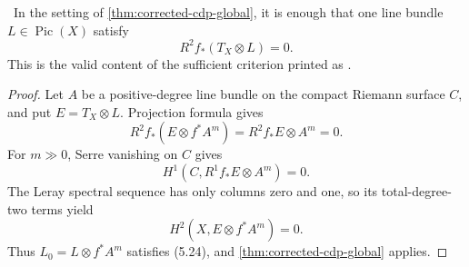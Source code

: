 \begin{corollary}\label{cor:corrected-cdp-relative}
\Verified\ In the setting of
\cref{thm:corrected-cdp-global}, it is enough that one line bundle
\(L\in\operatorname{Pic}(X)\) satisfy
\[
 R^2f_*(T_X\otimes L)=0.
\tag{5.29}
\]
This is the valid content of the sufficient criterion printed as
\cite[Proposition~2.4, p.~680]{CDP2020}.
\end{corollary}

\begin{proof}
Let \(A\) be a positive-degree line bundle on the compact Riemann surface
\(C\), and put \(E=T_X\otimes L\).  Projection formula gives
\[
 R^2f_*(E\otimes f^*A^m)=R^2f_*E\otimes A^m=0.
\]
For \(m\gg0\), Serre vanishing on \(C\) gives
\[
 H^1(C,R^1f_*E\otimes A^m)=0.
\]
The Leray spectral sequence has only columns zero and one, so its
total-degree-two terms yield
\[
 H^2(X,E\otimes f^*A^m)=0.
\]
Thus \(L_0=L\otimes f^*A^m\) satisfies (5.24), and
\cref{thm:corrected-cdp-global} applies.
\end{proof}

